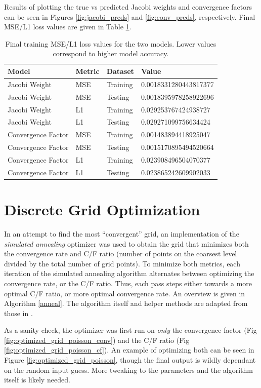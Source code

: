 Results of plotting the true vs predicted Jacobi weights and convergence factors can be seen in Figures \ref{fig:jacobi_preds} and \ref{fig:conv_preds}, respectively.  Final MSE/L1 loss values are given in Table \ref{tab:loss}.

\begin{table}[t]
\centering
\begin{tabular}{|l|l|l|l|}
\hline
Model & Metric & Dataset & Value \\

\hline
Jacobi Weight & MSE & Training & 0.0018331280443817377 \\
Jacobi Weight & MSE & Testing & 0.0018395978258922696 \\
Jacobi Weight & L1 & Training & 0.029253767424938727 \\
Jacobi Weight & L1 & Testing & 0.029271099756634424 \\
\hline
Convergence Factor & MSE & Training & 0.001483894418925047 \\
Convergence Factor & MSE & Testing & 0.0015170895494520664 \\
Convergence Factor & L1 & Training & 0.023908496504070377 \\
Convergence Factor & L1 & Testing & 0.023865242609902033 \\
\hline
\end{tabular}
\caption{Final training MSE/L1 loss values for the two models.  Lower values correspond to higher model accuracy.}
\label{tab:loss}
\end{table}

\section{Discrete Grid Optimization}

In an attempt to find the most ``convergent'' grid, an implementation of the \textit{simulated annealing} optimizer was used to obtain the grid that minimizes both the convergence rate and C/F ratio (number of points on the coarsest level divided by the total number of grid points).  To minimize both metrics, each iteration of the simulated annealing algorithm alternates between optimizing the convergence rate, or the C/F ratio.  Thus, each pass steps either towards a more optimal C/F ratio, or more optimal convergence rate.  An overview is given in Algorithm \ref{anneal}.  The algorithm itself and helper methods are adapted from those in \citep{Bertsimas1993}.

As a sanity check, the optimizer was first run on \textit{only} the convergence factor (Fig \ref{fig:optimized_grid_poisson_conv}) and the C/F ratio (Fig \ref{fig:optimized_grid_poisson_cf}).  An example of optimizing both can be seen in Figure \ref{fig:optimized_grid_poisson}, though the final output is wildly dependant on the random input guess.  More tweaking to the parameters and the algorithm itself is likely needed.

